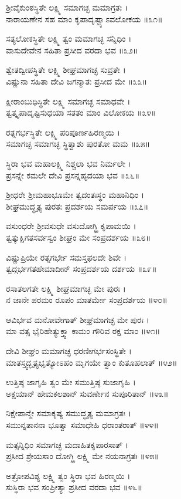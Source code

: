 	ಶ್ರೀವೈಕುಂಠಸ್ಥಿತೇ ಲಕ್ಷ್ಮಿ ಸಮಾಗಚ್ಛ ಮಮಾಗ್ರತಃ ।\\
	ನಾರಾಯಣೇನ ಸಹ ಮಾಂ ಕೃಪಾದೃಷ್ಟ್ಯಾಽವಲೋಕಯ ॥೩೧॥

	ಸತ್ಯಲೋಕಸ್ಥಿತೇ ಲಕ್ಷ್ಮಿ ತ್ವಂ ಮಮಾಗಚ್ಛ ಸನ್ನಿಧಿಂ ।\\
	ವಾಸುದೇವೇನ ಸಹಿತಾ ಪ್ರಸೀದ ವರದಾ ಭವ ॥೩೨॥

ಶ್ವೇತದ್ವೀಪಸ್ಥಿತೇ ಲಕ್ಷ್ಮಿ ಶೀಘ್ರಮಾಗಚ್ಛ ಸುವ್ರತೇ ।\\
ವಿಷ್ಣುನಾ ಸಹಿತಾ ದೇವಿ ಜಗನ್ಮಾತಃ ಪ್ರಸೀದ ಮೇ ॥೩೩॥

	ಕ್ಷೀರಾಂಬುಧಿಸ್ಥಿತೇ ಲಕ್ಷ್ಮಿ ಸಮಾಗಚ್ಛ ಸಮಾಧವೇ ।\\
	ತ್ವತ್ಕೃಪಾದೃಷ್ಟಿಸುಧಯಾ ಸತತಂ ಮಾಂ ವಿಲೋಕಯ ॥೩೪॥

ರತ್ನಗರ್ಭಸ್ಥಿತೇ ಲಕ್ಷ್ಮಿ ಪರಿಪೂರ್ಣಹಿರಣ್ಮಯಿ ।\\
ಸಮಾಗಚ್ಛ ಸಮಾಗಚ್ಛ ಸ್ಥಿತ್ವಾಶು ಪುರತೋ ಮಮ ॥೩೫॥

	ಸ್ಥಿರಾ ಭವ ಮಹಾಲಕ್ಷ್ಮಿ ನಿಶ್ಚಲಾ ಭವ ನಿರ್ಮಲೇ ।\\
	ಪ್ರಸನ್ನೇ ಕಮಲೇ ದೇವಿ ಪ್ರಸನ್ನಹೃದಯಾ ಭವ ॥೩೬॥

ಶ್ರೀಧರೇ ಶ್ರೀಮಹಾಭೂಮೇ ತ್ವದಂತಃಸ್ಥಂ ಮಹಾನಿಧಿಂ ।\\
ಶೀಘ್ರಮುದ್ಧೃತ್ಯ ಪುರತಃ ಪ್ರದರ್ಶಯ ಸಮರ್ಪಯ ॥೩೭॥

	ವಸುಂಧರೇ ಶ್ರೀವಸುಧೇ ವಸುದೋಗ್ಧ್ರಿ ಕೃಪಾಮಯಿ ।\\
	ತ್ವತ್ಕುಕ್ಷಿಗತಸರ್ವಸ್ವಂ ಶೀಘ್ರಂ ಮೇ ಸಂಪ್ರದರ್ಶಯ ॥೩೮॥

ವಿಷ್ಣುಪ್ರಿಯೇ ರತ್ನಗರ್ಭೇ ಸಮಸ್ತಫಲದೇ ಶಿವೇ ।\\
ತ್ವದ್ಗರ್ಭಗತಹೇಮಾದೀನ್ ಸಂಪ್ರದರ್ಶಯ ದರ್ಶಯ ॥೩೯॥

	ರಸಾತಲಗತೇ ಲಕ್ಷ್ಮಿ ಶೀಘ್ರಮಾಗಚ್ಛ ಮೇ ಪುರಃ ।\\
	ನ ಜಾನೇ ಪರಮಂ ರೂಪಂ ಮಾತರ್ಮೇ ಸಂಪ್ರದರ್ಶಯ ॥೪೦॥

ಆವಿರ್ಭವ ಮನೋವೇಗಾತ್ ಶೀಘ್ರಮಾಗಚ್ಛ ಮೇ ಪುರಃ ।\\
ಮಾ ವತ್ಸ ಭೈರಿಹೇತ್ಯುಕ್ತ್ವಾ ಕಾಮಂ ಗೌರಿವ ರಕ್ಷ ಮಾಂ ॥೪೧॥

	ದೇವಿ ಶೀಘ್ರಂ ಮಮಾಗಚ್ಛ ಧರಣೀಗರ್ಭಸಂಸ್ಥಿತೇ ।\\
	ಮಾತಸ್ತ್ವದ್ಭೃತ್ಯಭೃತ್ಯೋಽಹಂ ಮೃಗಯೇ ತ್ವಾಂ ಕುತೂಹಲಾತ್ ॥೪೨॥

ಉತ್ತಿಷ್ಠ ಜಾಗೃಹಿ ತ್ವಂ ಮೇ ಸಮುತ್ತಿಷ್ಠ ಸುಜಾಗೃಹಿ ।\\
ಅಕ್ಷಯಾನ್ ಹೇಮಕಲಶಾನ್ ಸುವರ್ಣೇನ ಸುಪೂರಿತಾನ್ ॥೪೩॥

	ನಿಕ್ಷೇಪಾನ್ಮೇ ಸಮಾಕೃಷ್ಯ ಸಮುದ್ಧೃತ್ಯ ಮಮಾಗ್ರತಃ ।\\
	ಸಮುನ್ನತಾನನಾ ಭೂತ್ವಾ ಸಮಾಧೇಹಿ ಧರಾಂತರಾತ್ ॥೪೪॥

ಮತ್ಸನ್ನಿಧಿಂ ಸಮಾಗಚ್ಛ ಮದಾಹಿತಕೃಪಾರಸಾತ್ ।\\
ಪ್ರಸೀದ ಶ್ರೇಯಸಾಂ ದೋಗ್ಧ್ರಿ ಲಕ್ಷ್ಮಿ ಮೇ ನಯನಾಗ್ರತಃ ॥೪೫॥

	ಅತ್ರೋಪವಿಶ್ಯ ಲಕ್ಷ್ಮಿ ತ್ವಂ ಸ್ಥಿರಾ ಭವ ಹಿರಣ್ಮಯಿ ।\\
	ಸುಸ್ಥಿರಾ ಭವ ಸಂಪ್ರೀತ್ಯಾ ಪ್ರಸೀದ ವರದಾ ಭವ ॥೪೬॥

